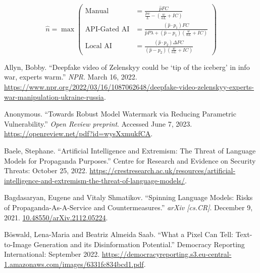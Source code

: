 \documentclass{article}
\begin{document}
\begin{equation}
  \hat{n} = \max \left(
    \begin{aligned}
      \text{Manual} &= \frac{\hat{p} FC}{\frac{\hat{p} w}{L} - \left( \frac{w}{\alpha L} + IC \right)} \\
      \text{API-Gated AI} &= \frac{(\hat{p} \cdot p_1) FC}{\hat{p} P \lambda + (\hat{p} - p_1) \left( \frac{w}{\alpha L} + IC \right)} \\
      \text{Local AI} &= \frac{(\hat{p} \cdot p_2) \Delta FC}{(\hat{p} - p_2) \left( \frac{w}{\alpha L} + IC \right)}
    \end{aligned}
  \right)
\end{equation}




\begin{thebibliography}{9}

  Allyn, Bobby. ``Deepfake video of Zelenskyy could be `tip of the iceberg' in info war, experts warm.'' \textit{NPR}. March 16, 2022. \href{https://www.npr.org/2022/03/16/1087062648/deepfake-video-zelenskyy-experts-war-manipulation-ukraine-russia}{https://www.npr.org/2022/03/16/1087062648/deepfake-video-zelenskyy-experts-war-manipulation-ukraine-russia}. 

  Anonymous. ``Towards Robust Model Watermark via Reducing Parametric Vulnerability.'' \textit{Open Review preprint}. Accessed June 7, 2023. \href{https://openreview.net/pdf?id=wysXxmukfCA}{https://openreview.net/pdf?id=wysXxmukfCA}. 

  Baele, Stephane. ``Artificial Intelligence and Extremism: The Threat of Language Models for Propaganda Purposes.'' Centre for Research and Evidence on Security Threats: October 25, 2022. \href{https://crestresearch.ac.uk/resources/artificial-intelligence-and-extremism-the-threat-of-language-models/}{https://crestresearch.ac.uk/resources/artificial-intelligence-and-extremism-the-threat-of-language-models/}.

  Bagdasaryan, Eugene and Vitaly Shmatikov. ``Spinning Language Models: Risks of Propaganda-As-A-Service and Countermeasures.'' \textit{arXiv [cs.CR]}. December 9, 2021. \href{https://arxiv.org/abs/2112.05224}{10.48550/arXiv.2112.05224}.

  Böswald, Lena-Maria and Beatriz Almeida Saab. ``What a Pixel Can Tell: Text-to-Image Generation and its Disinformation Potential.'' Democracy Reporting International: September 2022. \href{https://democracyreporting.s3.eu-central-1.amazonaws.com/images/6331fc834bcd1.pdf}{https://democracyreporting.s3.eu-central-1.amazonaws.com/images/6331fc834bcd1.pdf}. 


\end{thebibliography}
\end{document}
